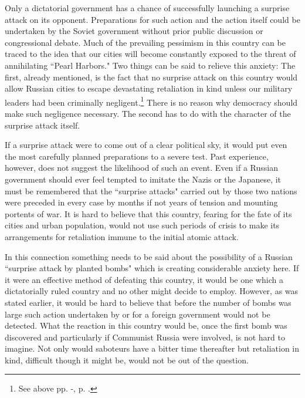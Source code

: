 Only a dictatorial government has a chance of successfully launching a surprise attack on its opponent. Preparations for such action and the action itself could be undertaken by the Soviet government without prior public discussion or congressional debate. Much of the prevailing pessimism in this country can be traced to the idea that our cities will become constantly exposed to the threat of annihilating ``Pearl Harbors." Two things can be said to relieve this anxiety: The first, already mentioned, is the fact that no surprise attack on this country would allow Russian cities to escape devastating retaliation in kind unless our military leaders had been criminally negligent.\footnote{See above pp. \pageref{II-Retaliation1}-\pageref{II-Retaliation2}, p. \pageref{II-Retaliation3}.} There is no reason why democracy should make such negligence necessary. The second has to do with the character of the surprise attack itself.

If a surprise attack were to come out of a clear political sky, it would put even the most carefully planned preparations to a severe test. Past experience, however, does not suggest the likelihood of such an event. Even if a Russian government should ever feel tempted to imitate the Nazis or the Japanese, it must be remembered that the ``surprise attacks" carried out by those two nations were preceded in every case by months if not years of tension and mounting portents of war. It is hard to believe that this country, fearing for the fate of its cities and urban population, would not use such periods of crisis to make its arrangements for retaliation immune to the initial atomic attack.

In this connection something needs to be said about the possibility of a Russian ``surprise attack by planted bombs" which is creating considerable anxiety here. If it were an effective method of defeating this country, it would be one which a dictatorially ruled country and no other might decide to employ. However, as was stated earlier, it would be hard to believe that before the number of bombs was large such action undertaken by or for a foreign government would not be detected. What the reaction in this country would be, once the first bomb was discovered and particularly if Communist Russia were involved, is not hard to imagine. Not only would saboteurs have a bitter time thereafter but retaliation in kind, difficult though it might be, would not be out of the question.

